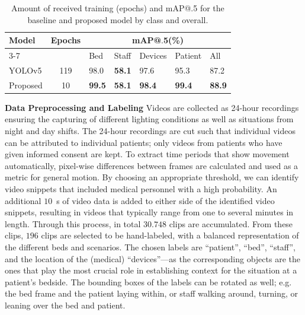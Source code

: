 \documentclass[conference]{IEEEtran}
\begin{document}
\begin{table}[t]
    \centering
    \begin{tabular}{l|c|llll|l}
    \multirow{2}{*}{Model}&\multirow{2}{*}{Epochs}&            \multicolumn{5}{c}{mAP@$.$5(\%)}            \\\cline{3-7}
                    &           & Bed              & Staff         & Devices       & Patient       & All   \\\hline
        YOLOv5      &       119 & 98.0             & \textbf{58.1} & 97.6          & 95.3          & 87.2  \\
        Proposed    &        10 & \textbf{99.5}    & \textbf{58.1} & \textbf{98.4} & \textbf{99.4} & \textbf{88.9}
    \end{tabular}
    \caption{
    Amount of received training (epochs) and mAP@.5 for the baseline and proposed model by class and overall.
    }
    \label{tab:ResultsMAP}
\end{table}


\noindent\textbf{Data Preprocessing and Labeling}
\label{sssec:ContextVideoPreprocessing}
Videos are collected as 24-hour recordings ensuring the capturing of different lighting conditions as well as situations from night and day shifts.
The 24-hour recordings are cut such that individual videos can be attributed to individual patients; only videos from patients who have given informed consent are kept.
To extract time periods that show movement automatically, pixel-wise differences between frames are calculated and used as a metric for general motion.
By choosing an appropriate threshold, we can identify video snippets that included medical personnel with a high probability.
An additional $10$~s of video data is added to either side of the identified video snippets, resulting in videos that typically range from one to several minutes in length.
Through this process, in total $30.748$ clips are accumulated.
From these clips, $196$ clips are selected to be hand-labeled, with a balanced representation of the different beds and scenarios.
The chosen labels are ``patient'', ``bed'', ``staff'', and the location of the (medical) ``devices''---as the corresponding objects are the ones that play the most crucial role in establishing context for the situation at a patient’s bedside.
The bounding boxes of the labels can be rotated as well; e.g. the bed frame and the patient laying within, or staff walking around, turning, or leaning over the bed and patient.
\end{document}

